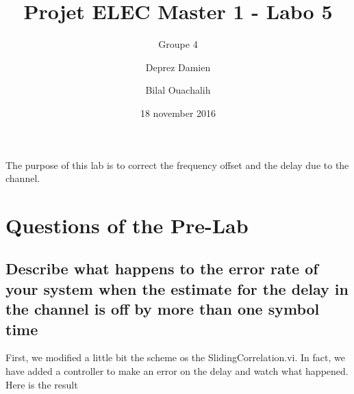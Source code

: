 \documentclass[frenchb, oneside, headings=normal]{scrartcl}
\begin{document}
\title{Projet ELEC Master 1 - Labo 5}
\subtitle{Groupe 4}
\author{Deprez Damien \and Bilal Ouachalih }
\date{18 november 2016}
\maketitle

The purpose of this lab is to correct the frequency offset and the delay due to the channel.

\section{Questions of the Pre-Lab}

\subsection{Describe what happens to the error rate of your system
when the estimate for the delay in the channel is off by more than one
symbol time}

First, we modified a little bit the scheme os the SlidingCorrelation.vi. In fact, we have added a controller to make an error on the delay and watch what happened. Here is the result
\end{document}
